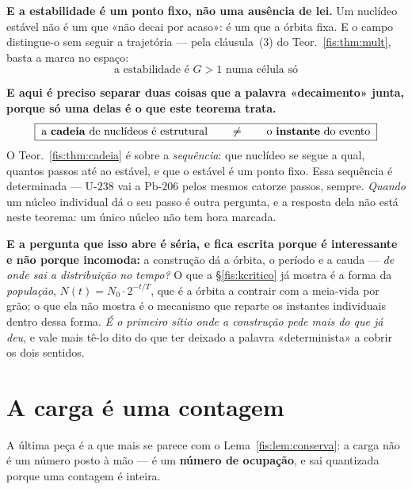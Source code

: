 \documentclass[livro.tex]{subfiles}
\begin{document}
\medskip\noindent\textbf{E a estabilidade é um ponto fixo, não uma ausência de
lei.} Um nuclídeo estável não é um que «não decai por acaso»: é um que a órbita
fixa. E o campo distingue-o sem seguir a trajetória --- pela
cláusula~(3) do Teor.~\ref{fis:thm:mult}, basta a marca no espaço:
\[
\boxed{\;\text{a estabilidade é }G>1\text{ numa célula só}\;}
\]

\medskip\noindent\textbf{E aqui é preciso separar duas coisas que a palavra
«decaimento» junta, porque só uma delas é o que este teorema trata.}
\[
\boxed{\;\text{a \textbf{cadeia} de nuclídeos é estrutural}
\qquad\neq\qquad
\text{o \textbf{instante} do evento}\;}
\]
O Teor.~\ref{fis:thm:cadeia} é sobre a \emph{sequência}: que nuclídeo se segue a
qual, quantos passos até ao estável, e que o estável é um ponto fixo. Essa
sequência é determinada --- $\mathrm{U}\text{-}238$ vai a
$\mathrm{Pb}\text{-}206$ pelos mesmos catorze passos, sempre. \emph{Quando} um
núcleo individual dá o seu passo é outra pergunta, e a resposta dela não está
neste teorema: um único núcleo não tem hora marcada.

\medskip\noindent\textbf{E a pergunta que isso abre é séria, e fica escrita
porque é interessante e não porque incomoda:} a construção dá a órbita, o
período e a cauda --- \emph{de onde sai a distribuição no tempo?} O que a
§\ref{fis:kcritico} já mostra é a forma da \emph{população}, $N(t)=N_0\cdot
2^{-t/T}$, que é a órbita a contrair com a meia-vida por grão; o que ela não
mostra é o mecanismo que reparte os instantes individuais dentro dessa forma.
\emph{É o primeiro sítio onde a construção pede mais do que já deu}, e vale mais
tê-lo dito do que ter deixado a palavra «determinista» a cobrir os dois sentidos.

\section{A carga é uma contagem}\label{fis:carga}

\noindent A última peça é a que mais se parece com o Lema~\ref{fis:lem:conserva}:
a carga não é um número posto à mão --- é um \textbf{número de ocupação}, e sai
quantizada porque uma contagem é inteira.
\end{document}
